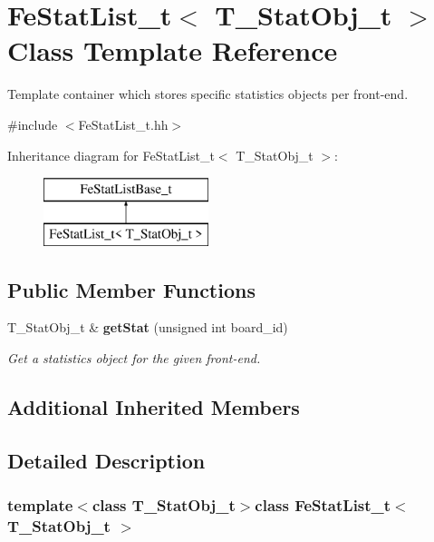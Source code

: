 \section{Fe\-Stat\-List\-\_\-t$<$ T\-\_\-\-Stat\-Obj\-\_\-t $>$ Class Template Reference}
\label{classFeStatList__t}


Template container which stores specific statistics objects per front-\/end.  




{\ttfamily \#include $<$Fe\-Stat\-List\-\_\-t.\-hh$>$}

Inheritance diagram for Fe\-Stat\-List\-\_\-t$<$ T\-\_\-\-Stat\-Obj\-\_\-t $>$\-:\begin{figure}[H]
\begin{center}
\leavevmode
\includegraphics[height=2.000000cm]{classFeStatList__t}
\end{center}
\end{figure}
\subsection*{Public Member Functions}
\begin{DoxyCompactItemize}
\item 
T\-\_\-\-Stat\-Obj\-\_\-t \& {\bf get\-Stat} (unsigned int board\-\_\-id)
\begin{DoxyCompactList}\small\item\em Get a statistics object for the given front-\/end. \end{DoxyCompactList}\end{DoxyCompactItemize}
\subsection*{Additional Inherited Members}


\subsection{Detailed Description}
\subsubsection*{template$<$class T\-\_\-\-Stat\-Obj\-\_\-t$>$class Fe\-Stat\-List\-\_\-t$<$ T\-\_\-\-Stat\-Obj\-\_\-t $>$}

